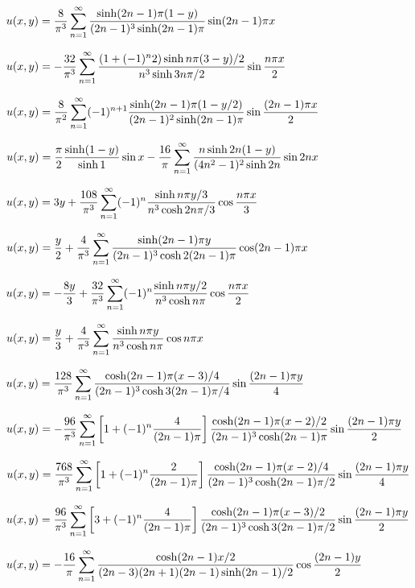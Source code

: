 \medskip

$u(x,y)=\displaystyle\frac{8}{\pi^{3}}\sum_{n=1}^{\infty}\frac{\sinh(2n-1)\pi(1-y)}{(2n-1)^{3}\sinh(2n-1)\pi}
\sin(2n-1)\pi x$

$u(x,y)=\displaystyle-\frac{32}{\pi^{3}}\sum_{n=1}^{\infty}\frac{(1+(-1)^{n}2)\sinh
n\pi(3-y)/2}{n^{3}\sinh3n\pi/2}
\sin\frac{n\pi x}{2}$

$u(x,y)=\displaystyle\frac{8}{\pi^{2}}\sum_{n=1}^{\infty}(-1)^{n+1}\frac{\sinh(2n-1)\pi(1-y/2)}{(2n-1)^{2}\sinh(2n-1)\pi}
\sin\frac{(2n-1)\pi x}{2}$

$u(x,y)=\displaystyle\frac{\pi}{2}\frac{\sinh(1-y)}{\sinh1}\sin
x-\frac{16}{\pi}\sum_{n=1}^{\infty}\frac{n\sinh2n(1-y)}{(4n^{2}-1)^{2}\sinh2n}\sin2nx$

$u(x,y)=\displaystyle3y+\frac{108}{\pi^{3}}\sum_{n=1}^{\infty}(-1)^{n}\frac{\sinh n\pi
y/3}{n^{3}\cosh2n\pi/3}\cos\frac{n\pi x}{3}$

$u(x,y)=\displaystyle\frac{y}{2}+\frac{4}{\pi^{3}}\sum_{n=1}^{\infty}\frac{\sinh(2n-1)\pi y}{(2n-1)^{3}\cosh2(2n-1)\pi}
\cos(2n-1)\pi x$

$u(x,y)=\displaystyle-\frac{8y}{3}+\frac{32}{\pi^{3}}\sum_{n=1}^{\infty}(-1)^{n}\frac{\sinh n\pi y/2}{n^{3}\cosh n\pi}\cos\frac{n\pi x}{2}$

$u(x,y)=\displaystyle\frac{y}{3}+\frac{4}{\pi^{3}}\sum_{n=1}^{\infty}\frac{\sinh n\pi y}{n^{3}\cosh n\pi}\cos n\pi x$

$u(x,y)=\displaystyle
\frac{128}{\pi^{3}}\sum_{n=1}^{\infty}\frac{\cosh(2n-1)\pi(x-3)/4}{(2n-1)^{3}\cosh3(2n-1)\pi/4}
\sin\frac{(2n-1)\pi y}{4}$

$u(x,y)
=\displaystyle-\frac{96}{\pi^{3}}\sum_{n=1}^{\infty}
\left[1+(-1)^{n}\frac{4}{(2n-1)\pi}\right]
{\frac{\cosh(2n-1)\pi(x-2)/2}{(2n-1)^{3}\cosh(2n-1)\pi}}
\sin\frac{(2n-1)\pi y}{2}$

$u(x,y)
=\displaystyle\frac{768}{\pi^{3}}\sum_{n=1}^{\infty}
\left[1+(-1)^{n}\frac{2}{(2n-1)\pi}\right]
{\frac{\cosh(2n-1)\pi(x-2)/4}{(2n-1)^{3}\cosh(2n-1)\pi/2}}
\sin\frac{(2n-1)\pi y}{4}$

$u(x,y)
=\displaystyle\frac{96}{\pi^{3}}\sum_{n=1}^{\infty}
\left[3+(-1)^{n}\frac{4}{(2n-1)\pi}\right]
{\frac{\cosh(2n-1)\pi(x-3)/2}{(2n-1)^{3}\cosh3(2n-1)\pi/2}}
\sin\frac{(2n-1)\pi y}{2}$

$u(x,y)=
-\displaystyle\frac{16}{\pi}\sum_{n=1}^{\infty}\frac{\cosh(2n-1)x/2}{(2n-3)(2n+1)(2n-1)\sinh(2n-1)/2}
\cos\frac{(2n-1)y}{2}$


